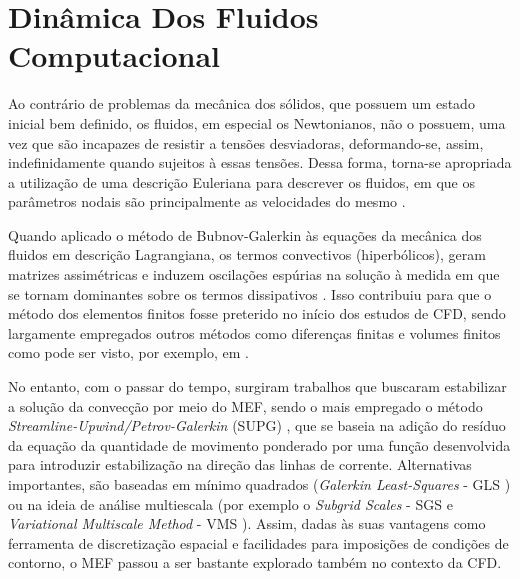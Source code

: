 \section{Dinâmica Dos Fluidos Computacional} \label{CFD}

Ao contrário de problemas da mecânica dos sólidos, que possuem um estado inicial bem definido, os fluidos, em especial os Newtonianos, não o possuem, uma vez que são incapazes de resistir a tensões desviadoras, deformando-se, assim, indefinidamente quando sujeitos à essas tensões. Dessa forma, torna-se apropriada a utilização de uma descrição Euleriana para descrever os fluidos, em que os parâmetros nodais são principalmente as velocidades do mesmo \cite{fernandes2020tecnica}.

Quando aplicado o método de Bubnov-Galerkin às equações da mecânica dos fluidos em descrição Lagrangiana, os termos convectivos (hiperbólicos), geram matrizes assimétricas e induzem oscilações espúrias na solução à medida em que se tornam dominantes sobre os termos dissipativos \cite{bazilevs2013computational,brooks1982streamline}. Isso contribuiu para que o método dos elementos finitos fosse preterido no início dos estudos de CFD, sendo largamente empregados outros métodos como diferenças finitas e volumes finitos como pode ser visto, por exemplo, em .

No entanto, com o passar do tempo, surgiram trabalhos que buscaram estabilizar a solução da convecção por meio do MEF, sendo o mais empregado o método \textit{Streamline-Upwind/Petrov-Galerkin} (SUPG) \cite{brooks1982streamline}, que se baseia na adição do resíduo da equação da quantidade de movimento ponderado por uma função desenvolvida para introduzir estabilização na direção das linhas de corrente. Alternativas importantes, são baseadas em mínimo quadrados (\textit{Galerkin Least-Squares} - GLS \cite{hughes1989new,tezduyar1991stabilized}) ou na ideia de análise multiescala (por exemplo o \textit{Subgrid Scales} - SGS \cite{piomelli1999large,hughes2000large} e \textit{Variational Multiscale Method} - VMS \cite{hughes1995multiscale,hughes1998variational,hughes2000large}). Assim, dadas às suas vantagens como ferramenta de discretização espacial e facilidades para imposições de condições de contorno, o MEF passou a ser bastante explorado também no contexto da CFD.

